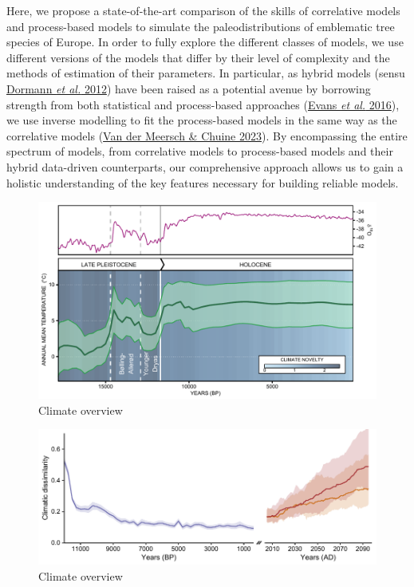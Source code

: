 \documentclass[11pt,]{article}
\begin{document}
Here, we propose a state-of-the-art comparison of the skills of
correlative models and process-based models to simulate the
paleodistributions of emblematic tree species of Europe. In order to
fully explore the different classes of models, we use different versions
of the models that differ by their level of complexity and the methods
of estimation of their parameters. In particular, as hybrid models
(sensu \protect\hyperlink{ref-Dormann2012}{Dormann \emph{et al.} 2012})
have been raised as a potential avenue by borrowing strength from both
statistical and process-based approaches
(\protect\hyperlink{ref-Evans2016}{Evans \emph{et al.} 2016}), we use
inverse modelling to fit the process-based models in the same way as the
correlative models (\protect\hyperlink{ref-VanderMeersch2023}{Van der
Meersch \& Chuine 2023}). By encompassing the entire spectrum of models,
from correlative models to process-based models and their hybrid
data-driven counterparts, our comprehensive approach allows us to gain a
holistic understanding of the key features necessary for building
reliable models.

\begin{figure}
\centering
\includegraphics{paper_files/figure-latex/figure_climate_overview-1.pdf}
\caption{Climate overview}
\end{figure}

\begin{figure}
\centering
\includegraphics{paper_files/figure-latex/figure_climatedissimilarity-1.pdf}
\caption{Climate overview}
\end{figure}
\end{document}
